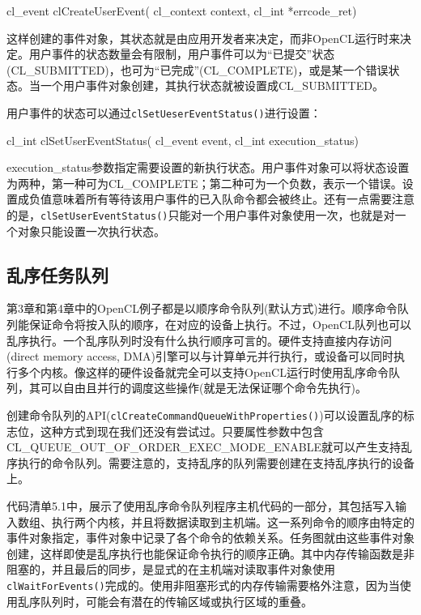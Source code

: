 \begin{codebox}[cpp]
cl_event
clCreateUserEvent(
  cl_context context,
  cl_int *errcode_ret)
\end{codebox}

这样创建的事件对象，其状态就是由应用开发者来决定，而非OpenCL运行时来决定。用户事件的状态数量会有限制，用户事件可以为“已提交”状态(CL\_\allowbreak{}SUBMITTED)，也可为“已完成”(CL\_\allowbreak{}COMPLETE)，或是某一个错误状态。当一个用户事件对象创建，其执行状态就被设置成CL\_\allowbreak{}SUBMITTED。

用户事件的状态可以通过\texttt{clSetUeserEventStatus()}进行设置：

\begin{codebox}[cpp]
cl_int clSetUserEventStatus(
  cl_event event,
  cl_int execution_status)
\end{codebox}

execution\_\allowbreak{}status参数指定需要设置的新执行状态。用户事件对象可以将状态设置为两种，第一种可为CL\_\allowbreak{}COMPLETE；第二种可为一个负数，表示一个错误。设置成负值意味着所有等待该用户事件的已入队命令都会被终止。还有一点需要注意的是，\texttt{clSetUserEventStatus()}只能对一个用户事件对象使用一次，也就是对一个对象只能设置一次执行状态。

\subsection{乱序任务队列}

第3章和第4章中的OpenCL例子都是以顺序命令队列(默认方式)进行。顺序命令队列能保证命令将按入队的顺序，在对应的设备上执行。不过，OpenCL队列也可以乱序执行。一个乱序队列时没有什么执行顺序可言的。硬件支持直接内存访问(direct memory access, DMA)引擎可以与计算单元并行执行，或设备可以同时执行多个内核。像这样的硬件设备就完全可以支持OpenCL运行时使用乱序命令队列，其可以自由且并行的调度这些操作(就是无法保证哪个命令先执行)。

创建命令队列的API(\texttt{clCreateCommandQueueWithProperties()})可以设置乱序的标志位，这种方式到现在我们还没有尝试过。只要属性参数中包含CL\_\allowbreak{}QUEUE\_\allowbreak{}OUT\_\allowbreak{}OF\_\allowbreak{}ORDER\_\allowbreak{}EXEC\_\allowbreak{}MODE\_\allowbreak{}ENABLE就可以产生支持乱序执行的命令队列。需要注意的，支持乱序的队列需要创建在支持乱序执行的设备上。

代码清单5.1中，展示了使用乱序命令队列程序主机代码的一部分，其包括写入输入数组、执行两个内核，并且将数据读取到主机端。这一系列命令的顺序由特定的事件对象指定，事件对象中记录了各个命令的依赖关系。任务图就由这些事件对象创建，这样即使是乱序执行也能保证命令执行的顺序正确。其中内存传输函数是非阻塞的，并且最后的同步，是显式的在主机端对读取事件对象使用\texttt{clWaitForEvents()}完成的。使用非阻塞形式的内存传输需要格外注意，因为当使用乱序队列时，可能会有潜在的传输区域或执行区域的重叠。

